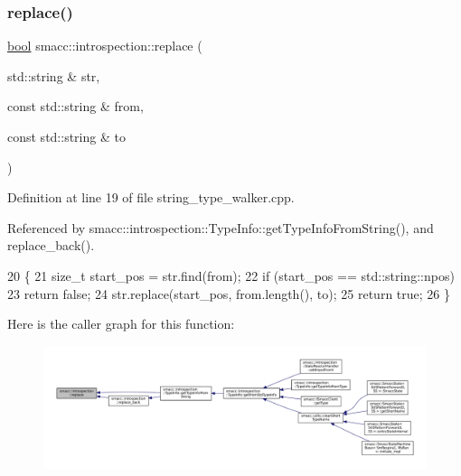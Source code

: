 \subsubsection{\texorpdfstring{replace()}{replace()}}
{\footnotesize\ttfamily \hyperlink{classbool}{bool} smacc\+::introspection\+::replace (\begin{DoxyParamCaption}\item[{std\+::string \&}]{str,  }\item[{const std\+::string \&}]{from,  }\item[{const std\+::string \&}]{to }\end{DoxyParamCaption})}



Definition at line 19 of file string\+\_\+type\+\_\+walker.\+cpp.



Referenced by smacc\+::introspection\+::\+Type\+Info\+::get\+Type\+Info\+From\+String(), and replace\+\_\+back().


\begin{DoxyCode}
20 \{
21     \textcolor{keywordtype}{size\_t} start\_pos = str.find(from);
22     \textcolor{keywordflow}{if} (start\_pos == std::string::npos)
23         \textcolor{keywordflow}{return} \textcolor{keyword}{false};
24     str.replace(start\_pos, from.length(), to);
25     \textcolor{keywordflow}{return} \textcolor{keyword}{true};
26 \}
\end{DoxyCode}
Here is the caller graph for this function\+:
\nopagebreak
\begin{figure}[H]
\begin{center}
\leavevmode
\includegraphics[width=350pt]{namespacesmacc_1_1introspection_a48571b9bf3b115d2a83cc0147c96d0bd_icgraph}
\end{center}
\end{figure}
\mbox{\label{namespacesmacc_1_1introspection_a19350163cda321a04645dcd6f6585f24}} 
